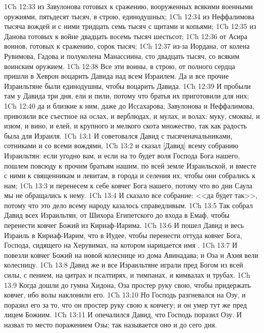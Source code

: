 \vs 1Ch 12:33 из  Завулонова готовых к сражению, вооруженных всякими военными оружиями, пятьдесят тысяч, в строю, единодушных;
\vs 1Ch 12:34 из  Неффалимова тысяча вождей и с ними тридцать семь тысяч с щитами и копьями;
\vs 1Ch 12:35 из  Данова готовых к войне двадцать восемь тысяч шестьсот;
\vs 1Ch 12:36 от Асира воинов, готовых к сражению, сорок тысяч;
\vs 1Ch 12:37 из-за Иордана, от колена Рувимова, Гадова и полуколена Манассиина, сто двадцать тысяч, со всяким воинским оружием.
\rsbpar\vs 1Ch 12:38 Все эти воины, в строю, от полного сердца пришли в Хеврон воцарить Давида над всем Израилем. Да и все прочие Израильтяне были единодушны, чтобы воцарить Давида.
\vs 1Ch 12:39 И пробыли там у Давида три дня, ели и пили, потому что братья их  приготовили для них;
\vs 1Ch 12:40 да и близкие к ним, даже до  Иссахарова, Завулонова и Неффалимова, привозили все съестное на ослах, и верблюдах, и мулах, и волах: муку, смоквы, и изюм, и вино, и елей, и крупного и мелкого скота множество, так как радость была для Израиля.
\vs 1Ch 13:1 И советовался Давид с тысяченачальниками, сотниками и со всеми вождями,
\vs 1Ch 13:2 и сказал [Давид] всему собранию Израильтян: если угодно вам, и если на то будет воля Господа Бога нашего, пошлем повсюду к прочим братьям нашим, по всей земле Израильской, и вместе с ними к священникам и левитам, в города и селения их, чтобы они собрались к нам;
\vs 1Ch 13:3 и перенесем к себе ковчег Бога нашего, потому что во дни Саула мы не обращались к нему.
\vs 1Ch 13:4 И сказало все собрание: <<да будет так>>, потому что это дело всему народу казалось справедливым.
\vs 1Ch 13:5 Так собрал Давид всех Израильтян, от Шихора Египетского до входа в Емаф, чтобы перенести ковчег Божий из Кириаф-Иарима.
\vs 1Ch 13:6 И пошел Давид и весь Израиль в Кириаф-Иарим, что в Иудее, чтобы перенести оттуда ковчег Бога, Господа, сидящего на Херувимах, на котором нарицается имя .
\vs 1Ch 13:7 И повезли ковчег Божий на новой колеснице из дома Авинадава; и Оза и Ахия вели колесницу.
\vs 1Ch 13:8 Давид же и все Израильтяне играли пред Богом из всей силы, с пением, на цитрах и псалтирях, и тимпанах, и кимвалах и трубах.
\vs 1Ch 13:9 Когда дошли до гумна Хидона, Оза простер руку свою, чтобы придержать ковчег, ибо волы наклонили его.
\vs 1Ch 13:10 Но Господь разгневался на Озу, и поразил его за то, что он простер руку свою к ковчегу; и он умер тут же пред лицем Божиим.
\vs 1Ch 13:11 И опечалился Давид, что Господь поразил Озу. И назвал то место поражением Озы; так называется оно и до сего дня.
